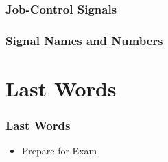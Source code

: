 \documentclass[newPxFont,sthlmFooter,nooffset]{beamer}
\begin{document}
\begin{frame}[fragile,t]
  \frametitle{Job-Control Signals}
  
\end{frame}



\begin{frame}[fragile,t]
  \frametitle{Signal Names and Numbers}
  
\end{frame}

\section{Last Words}

\begin{frame}[t]
  \frametitle{Last Words}
\begin{itemize}
\item Prepare for Exam
\end{itemize}
\end{frame}
\end{document}
